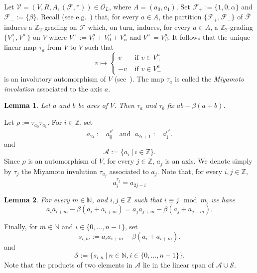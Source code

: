 \documentclass[a4paper]{amsart}
\newtheorem{lemma}{Lemma}[section]
\newcommand{\N}{{\mathbb N}}
\newcommand{\Z}{{\mathbb Z}}
\begin{document}
Let ${\mathcal V}=(V, R, A, (\mathcal F, \ast))\in {\mathcal O}_{L}$, where $A=(a_0, a_1)$.  
 Set ${\mathcal F}_+:=\{1,0, \alpha\}$ and ${\mathcal F}_-:=\{ \beta\}$.
Recall (see e.g.~\cite[Section~3]{KMS}) that, for every $a\in A$, the partition $\{{\mathcal F}_+, {\mathcal F}_-\}$ of ${\overline{\mathcal F}}$ induces a $\Z_2$-grading on ${\mathcal F}$ which, on turn, induces, for every $a\in A$, a $\Z_2$-grading $\{V_+^a, V_-^a\}$ on $V$ where $V_+^a:=V_1^a+V_0^a+V_{\alpha}^a$ and $V_-^a=V_{ \beta}^a$. It follows that the unique linear map $\tau_a$ from $ V$ to $V$ such that 
   $$
   v\mapsto 
\begin{cases}
v & \mbox{ if } v\in  V_+^a\\
-v &  \mbox{ if }  v\in  V_-^a
\end{cases} 
$$  
 is  an involutory automorphism of $V$ (see~\cite[Proposition 3.4]{HRS}). The map  $\tau_a$ is called the {\it Miyamoto involution} associated to the axis $a$. 
  
\begin{lemma}\cite[Lemma~2.1]{FMS2}\label{invariant}
Let $a$ and $b$ be axes of $V$. Then $\tau_a$ and $\tau_{b}$ fix $ab- \beta(a+b)$.
\end{lemma}
 
Let $\rho:=\tau_{a_0}\tau_{a_1}$. For $i\in \Z$, set $$a_{2i}:=a_0^{\rho^i} \:\:\mbox{  and } \:a_{2i+1}:=a_1^{\rho^i}.
$$
and 
$$\mathcal A:=\{a_i\:|\: i\in \mathbb Z\}.
$$
 Since $\rho$ is an automorphism of $V$, for every $j\in \Z$,  $a_j$ is an axis. We denote simply by $\tau_j$ the Miyamoto involution $\tau_{a_j}$ associated to $a_j$. Note that, for every $i,j\in \Z$,
\begin{equation}\label{obviousrelation}
a_i^{\tau_j}=a_{2j-i}
\end{equation}

\begin{lemma}\cite[Lemma~2.2]{FMS2}\label{invariances}
For every $m\in \N$,  and $ i,j\in \Z$ such that $i\equiv j \: \bmod m$, we have  
$$
a_ia_{i+m}-\beta (a_i+a_{i+m})=a_ja_{j+m}-\beta (a_j+a_{j+m}).
$$
\end{lemma}




Finally, for $m\in \N$ and $ i\in \{0, \ldots , n-1\}$, set
\begin{equation}\label{s}
s_{i,m}:=a_ia_{i+m}-\beta (a_i+a_{i+m}). 
\end{equation}
and 
$$
\mathcal S:=\{s_{i,n}\:|\: n\in \N, i\in  \{0, \ldots , n-1\}\}.$$
Note that the products of two elements in $\mathcal A$ lie in the linear span of $\mathcal A\cup \mathcal S$.
\end{document}
